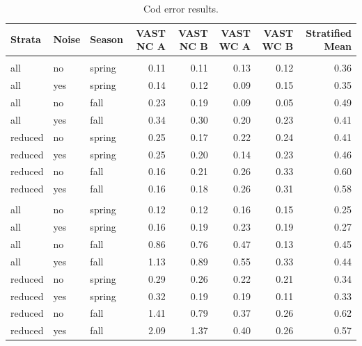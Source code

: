 \documentclass[
  12pt,
]{article}
\begin{document}
\begin{table}

\caption{\label{tab:CodERROR}Cod error results.}
\centering
\fontsize{10}{12}\selectfont
\begin{tabular}[t]{lllrrrrr}
\toprule
Strata & Noise & Season & VAST NC  A & VAST NC  B & VAST WC A & VAST WC B & Stratified Mean\\
\midrule
\addlinespace[0.3em]
\multicolumn{1}{l}{\textbf{Constant Temp.}}\\
\hspace{1em}all & no & spring & 0.11 & 0.11 & 0.13 & 0.12 & 0.36\\
\hspace{1em}all & yes & spring & 0.14 & 0.12 & 0.09 & 0.15 & 0.35\\
\hspace{1em}all & no & fall & 0.23 & 0.19 & 0.09 & 0.05 & 0.49\\
\hspace{1em}all & yes & fall & 0.34 & 0.30 & 0.20 & 0.23 & 0.41\\
\hspace{1em}reduced & no & spring & 0.25 & 0.17 & 0.22 & 0.24 & 0.41\\
\hspace{1em}reduced & yes & spring & 0.25 & 0.20 & 0.14 & 0.23 & 0.46\\
\hspace{1em}reduced & no & fall & 0.16 & 0.21 & 0.26 & 0.33 & 0.60\\
\hspace{1em}reduced & yes & fall & 0.16 & 0.18 & 0.26 & 0.31 & 0.58\\
\addlinespace[0.3em]
\multicolumn{1}{l}{\textbf{Increasing Temp.}}\\
\hspace{1em}all & no & spring & 0.12 & 0.12 & 0.16 & 0.15 & 0.25\\
\hspace{1em}all & yes & spring & 0.16 & 0.19 & 0.23 & 0.19 & 0.27\\
\hspace{1em}all & no & fall & 0.86 & 0.76 & 0.47 & 0.13 & 0.45\\
\hspace{1em}all & yes & fall & 1.13 & 0.89 & 0.55 & 0.33 & 0.44\\
\hspace{1em}reduced & no & spring & 0.29 & 0.26 & 0.22 & 0.21 & 0.34\\
\hspace{1em}reduced & yes & spring & 0.32 & 0.19 & 0.19 & 0.11 & 0.33\\
\hspace{1em}reduced & no & fall & 1.41 & 0.79 & 0.37 & 0.26 & 0.62\\
\hspace{1em}reduced & yes & fall & 2.09 & 1.37 & 0.40 & 0.26 & 0.57\\
\bottomrule
\end{tabular}
\end{table}
\end{document}
